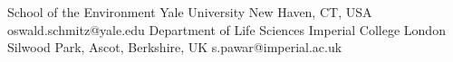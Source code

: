 

{
  {School of the Environment}
  {Yale University}
  {New Haven, CT, USA}
  {oswald.schmitz@yale.edu}
}
{
  {Department of Life Sciences}
  {Imperial College London}
  {Silwood Park, Ascot, Berkshire, UK}
  {s.pawar@imperial.ac.uk}
}